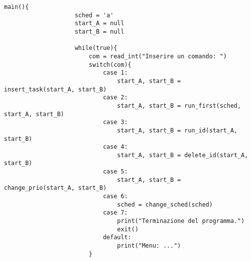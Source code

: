         \begin{center}
           	\begin{lstlisting}[language=pseudo, gobble=14]
                main(){
                    sched = 'a'
                    start_A = null
                    start_B = null
                    
                    while(true){
                        com = read_int("Inserire un comando: ")
                        switch(com){
                            case 1:
                                start_A, start_B = insert_task(start_A, start_B)
                            case 2:
                                start_A, start_B = run_first(sched, start_A, start_B)
                            case 3:
                                start_A, start_B = run_id(start_A, start_B)
                            case 4:
                                start_A, start_B = delete_id(start_A, start_B)
                            case 5:
                                start_A, start_B = change_prio(start_A, start_B)
                            case 6:
                                sched = change_sched(sched)
                            case 7:
                                print("Terminazione del programma.")
                                exit()
                            default:
                                print("Menu: ...")
                        }
                        

\end{lstlisting}
\end{center}
